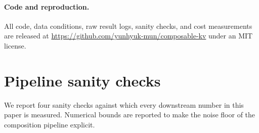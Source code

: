 \paragraph{Code and reproduction.} All code, data conditions, raw result logs, sanity checks, and cost measurements are released at \url{https://github.com/yunhyuk-mun/composable-kv} under an MIT license.




\appendix

\section{Pipeline sanity checks}\label{app:sanity}

We report four sanity checks against which every downstream number in this paper is measured. Numerical bounds are reported to make the noise floor of the composition pipeline explicit.

